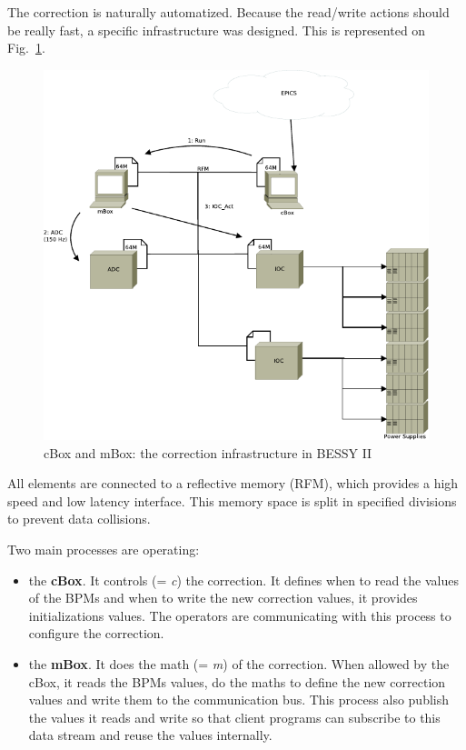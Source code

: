 The correction is naturally automatized. Because the read/write actions should be really fast, a specific infrastructure was designed. This is represented on Fig.~\ref{fig:cbox_mbox}. 

\begin{figure}[!h]
    \centering
    \includegraphics[width=.85\linewidth]{img/mBox_cBox}
    \caption{\label{fig:cbox_mbox}cBox and mBox: the correction infrastructure in BESSY II}
\end{figure}

All elements are connected to a reflective memory (RFM), which provides a high speed and low latency interface. This memory space is split in specified divisions to prevent data collisions.

Two main processes are operating:
\begin{itemize}
    \item the \textbf{cBox}. It controls (= \textit{c}) the correction. It defines when to read the values of the BPMs and when to write the new correction values, it provides initializations values. The operators are communicating with this process to configure the correction.
    \item the \textbf{mBox}. It does the math (= \textit{m}) of the correction. When allowed by the cBox, it reads the BPMs values, do the maths to define the new correction values and write them to the communication bus. This process also publish the values it reads and write so that client programs can subscribe to this data stream and reuse the values internally.
\end{itemize}

